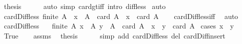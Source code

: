 \begin{isabellebody}
\ {\isacharquery}{\kern0pt}thesis\isanewline
\ \ \ \ \isamarkupfalse%
\ {\isacharparenleft}{\kern0pt}auto\ simp{\isacharcolon}{\kern0pt}\ card{\isacharunderscore}{\kern0pt}gt{\isacharunderscore}{\kern0pt}{}{\isacharunderscore}{\kern0pt}iff\ intro{\isacharcolon}{\kern0pt}\ diff{\isacharunderscore}{\kern0pt}less{\isacharparenright}{\kern0pt}\isanewline
{}\isamarkupfalse%
\ auto%
\endisatagproof
{\isafoldproof}%
%
\isadelimproof
\isanewline
%
\endisadelimproof
\isanewline
{}\isamarkupfalse%
\ card{\isacharunderscore}{\kern0pt}Diff{}{\isacharunderscore}{\kern0pt}less{\isacharcolon}{\kern0pt}\ {\isachardoublequoteopen}finite\ A\ {\isasymLongrightarrow}\ x\ {\isasymin}\ A\ {\isasymLongrightarrow}\ card\ {\isacharparenleft}{\kern0pt}A\ {\isacharminus}{\kern0pt}\ {\isacharbraceleft}{\kern0pt}x{\isacharbraceright}{\kern0pt}{\isacharparenright}{\kern0pt}\ {\isacharless}{\kern0pt}\ card\ A{\isachardoublequoteclose}\isanewline
%
\isadelimproof
\ \ %
\endisadelimproof
%
\isatagproof
{}\isamarkupfalse%
\ card{\isacharunderscore}{\kern0pt}Diff{}{\isacharunderscore}{\kern0pt}less{\isacharunderscore}{\kern0pt}iff\ \isamarkupfalse%
\ auto%
\endisatagproof
{\isafoldproof}%
%
\isadelimproof
\isanewline
%
\endisadelimproof
\isanewline
{}\isamarkupfalse%
\ card{\isacharunderscore}{\kern0pt}Diff{}{\isacharunderscore}{\kern0pt}less{\isacharcolon}{\kern0pt}\isanewline
\ \ \ {\isachardoublequoteopen}finite\ A{\isachardoublequoteclose}\ {\isachardoublequoteopen}x\ {\isasymin}\ A{\isachardoublequoteclose}\ {\isachardoublequoteopen}y\ {\isasymin}\ A{\isachardoublequoteclose}\ \ {\isachardoublequoteopen}card\ {\isacharparenleft}{\kern0pt}A\ {\isacharminus}{\kern0pt}\ {\isacharbraceleft}{\kern0pt}x{\isacharbraceright}{\kern0pt}\ {\isacharminus}{\kern0pt}\ {\isacharbraceleft}{\kern0pt}y{\isacharbraceright}{\kern0pt}{\isacharparenright}{\kern0pt}\ {\isacharless}{\kern0pt}\ card\ A{\isachardoublequoteclose}\isanewline
%
\isadelimproof
%
\endisadelimproof
%
\isatagproof
{}\isamarkupfalse%
\ {\isacharparenleft}{\kern0pt}cases\ {\isachardoublequoteopen}x\ {\isacharequal}{\kern0pt}\ y{\isachardoublequoteclose}{\isacharparenright}{\kern0pt}\isanewline
\ \ \isamarkupfalse%
\ True\isanewline
\ \ \isamarkupfalse%
\ assms\ \isamarkupfalse%
\ {\isacharquery}{\kern0pt}thesis\isanewline
\ \ \ \ \isamarkupfalse%
\ {\isacharparenleft}{\kern0pt}simp\ add{\isacharcolon}{\kern0pt}\ card{\isacharunderscore}{\kern0pt}Diff{}{\isacharunderscore}{\kern0pt}less\ del{\isacharcolon}{\kern0pt}\ card{\isacharunderscore}{\kern0pt}Diff{\isacharunderscore}{\kern0pt}insert{\isacharparenright}{\kern0pt}\isanewline

\end{isabellebody}
